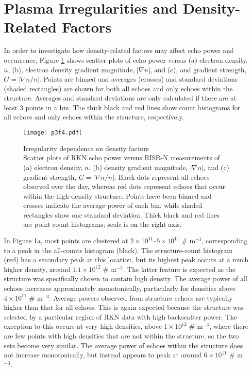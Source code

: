 \section{Plasma Irregularities and Density-Related Factors}
In order to investigate how density-related factors may affect echo power and occurrence, Figure \ref{fig:density} shows scatter plots of echo power versus (a) electron density, \(n\), (b), electron density gradient magnitude, \(|\nabla n|\), and (c), and gradient strength, \(G = |\nabla n/n|\). Points are binned and averages (crosses) and standard deviations (shaded rectangles) are shown for both all echoes and only echoes within the structure.  Averages and standard deviations are only calculated if there are at least 3 points in a bin.  The thick black and red lines show count histograms for all echoes and only echoes within the structure, respectively.

\begin{figure}
\texttt{[image: p3f4.pdf]}
  \caption[Irregularity dependence on density factors]{{\:}Irregularity dependence on density factors\\ Scatter plots of RKN echo power versus RISR-N measurements of (a) electron density, \(n\), (b) density gradient magnitude, \(|\nabla n|\), and (c) gradient strength, \(G=|\nabla n/n|\).  Black dots represent all echoes observed over the day, whereas red dots represent echoes that occur within the high-density structure.  Points have been binned and crosses indicate the average power of each bin, while shaded rectangles show one standard deviation. Thick black and red lines are point count histograms; scale is on the right axis.}
  \label{fig:density}
\end{figure}

In Figure \ref{fig:density}a, most points are clustered at \(2\times10^{11}\)--\(5\times10^{11}\) \# m\(^{-3}\), corresponding to a peak in the all-counts histogram (black).  The structure-count histogram (red) has a secondary peak at this location, but its highest peak occurs at a much higher density, around \(1.1\times10^{12}\) \# m\(^{-3}\).  The latter feature is expected as the structure was specifically chosen to contain high density. The average power of all echoes increases approximately monotonically, particularly for densities above \(4\times10^{11}\) \# m\(^{-3}\). Average powers observed from structure echoes are typically higher than that for all echoes.  This is again expected because the structure was selected by a particular region of RKN data with high backscatter power.  The exception to this occurs at very high densities, above \(1\times10^{12}\) \# m\(^{-3}\), where there are few points with high densities that are not within the structure, so the two sets become very similar.  The average power of echoes within the structure does not increase monotonically, but instead appears to peak at around \(6\times10^{11}\) \# m\(^{-3}\).

